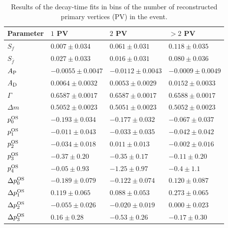 \begin{table}
  \centering
  \caption{Results of the decay-time fits in bins of the number of reconstructed primary vertices (PV) in the event.}
  \label{tab:timesplitsnPV}
    \begin{tabular}{llll}
      \toprule
      Parameter & $1$ PV & $2$ PV & $>2$ PV\\
      \midrule
      $S_{f}$               & $0.007\pm0.034$      & $0.061\pm0.031$      & $0.118\pm0.035$   \\   
      $S_{\bar f}$           & $0.027\pm0.033$      & $0.016\pm0.031$      & $0.080\pm0.036$   \\ 
      \midrule
      $A_{\rm P}$            & $-0.0055\pm0.0047$    & $-0.0112\pm0.0043$    & $-0.0009\pm0.0049$ \\
      $A_{\rm D}$             & $0.0064\pm0.0032$     & $0.0053\pm0.0029$     & $0.0152\pm0.0033$  \\ 
      \midrule
      $\Gamma$              & $0.6587\pm0.0017$     & $0.6587\pm0.0017$     & $0.6588\pm0.0017$  \\  
      $\Delta m$             & $0.5052\pm0.0023$     & $0.5051\pm0.0023$     & $0.5052\pm0.0023$  \\ 
      \midrule
      $p_{0}^{\rm OS}$             & $-0.193\pm0.034$      & $-0.177\pm0.032$      & $-0.067\pm0.037$   \\   
      $p_{1}^{\rm OS}$             & $-0.011\pm0.043$      & $-0.033\pm0.035$      & $-0.042\pm0.042$   \\   
      $p_{2}^{\rm OS}$             & $-0.034\pm0.018$      & $0.011\pm0.013$       & $-0.002\pm0.016$   \\   
      $p_{3}^{\rm OS}$             & $-0.37\pm0.20$        & $-0.35\pm0.17$        & $-0.11\pm0.20$     \\   
      $p_{4}^{\rm OS}$             & $-0.05\pm0.93$        & $-1.25\pm0.97$        & $-0.4\pm1.1$       \\ 
      $\Delta p_{0}^{\rm OS}$       & $-0.189\pm0.079$      & $-0.122\pm0.074$      & $0.120\pm0.087$    \\ 
      $\Delta p_{1}^{\rm OS}$       & $0.119\pm0.065$       & $0.088\pm0.053$       & $0.273\pm0.065$    \\   
      $\Delta p_{2}^{\rm OS}$       & $-0.055\pm0.026$      & $-0.020\pm0.019$      & $0.000\pm0.023$    \\   
      $\Delta p_{3}^{\rm OS}$       & $0.16\pm0.28$         & $-0.53\pm0.26$        & $-0.17\pm0.30$     \\   

\end{tabular}
\end{table}
